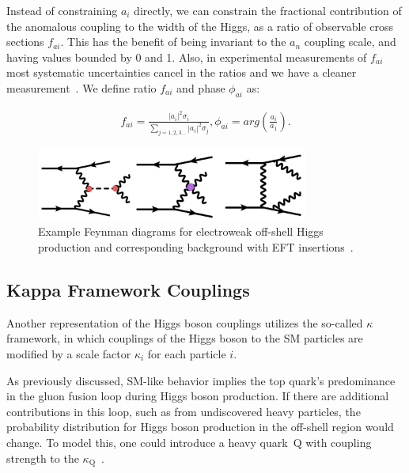Instead of constraining $a_i$ directly, we can constrain the fractional contribution of the anomalous coupling to the width of the Higgs, as a ratio of observable cross sections $f_{ai}$. This has the benefit of being invariant to the $a_n$ coupling scale, and having values bounded by 0 and 1. Also, in experimental measurements of $f_{ai}$ most systematic uncertainties cancel in the ratios and we have a cleaner measurement~\cite{2020}. We define ratio $f_{ai}$ and phase $\phi_{ai}$ as:

\begin{equation}
\label{eq:faiandphase}
\begin{gathered}
f_{ai} = \frac{|a_i|^2 \sigma_i}{\sum_{j=1,2,3...}|a_i|^2 \sigma_j},   \phi_{ai} = arg(\frac{a_i}{a_1}).
\end{gathered}
\end{equation}

\begin{figure}[!h]
\centering
\includegraphics[width=0.8\textwidth,clip] {figures/EFTdiagrams2.jpg}
\caption{Example Feynman diagrams for electroweak off-shell Higgs production and corresponding background with EFT insertions~\cite{offshellWGnote}.}
\label{fig:EFTdiagrams2}
\end{figure}

\subsection{Kappa Framework Couplings}

Another representation of the Higgs boson couplings utilizes the so-called $\kappa$ framework, in which couplings of 
the Higgs boson to the SM particles are modified by a scale factor $\kappa_i$ for each particle $i$.

As previously discussed, SM-like behavior implies the top quark's predominance in the gluon fusion loop during Higgs boson production. If there are additional contributions in this loop, such as from undiscovered heavy particles, the probability distribution for Higgs boson production in the off-shell region would change. To model this, one could introduce a heavy quark~$\mathrm{Q}$ with coupling strength to the \Hboson $\kappa_\mathrm{Q}$~\cite{Gritsan:2020pib,Davis:2021tiv}.

